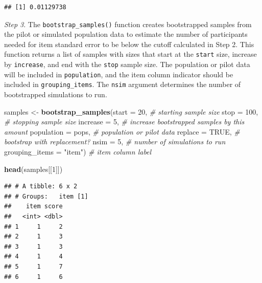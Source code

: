 \documentclass[
  man]{apa7}
\newenvironment{Shaded}{\begin{snugshade}}{\end{snugshade}}
\newcommand{\AttributeTok}[1]{\textcolor[rgb]{0.13,0.29,0.53}{#1}}
\newcommand{\CommentTok}[1]{\textcolor[rgb]{0.56,0.35,0.01}{\textit{#1}}}
\newcommand{\ConstantTok}[1]{\textcolor[rgb]{0.56,0.35,0.01}{#1}}
\newcommand{\DecValTok}[1]{\textcolor[rgb]{0.00,0.00,0.81}{#1}}
\newcommand{\FunctionTok}[1]{\textcolor[rgb]{0.13,0.29,0.53}{\textbf{#1}}}
\newcommand{\NormalTok}[1]{#1}
\newcommand{\OtherTok}[1]{\textcolor[rgb]{0.56,0.35,0.01}{#1}}
\newcommand{\SpecialCharTok}[1]{\textcolor[rgb]{0.81,0.36,0.00}{\textbf{#1}}}
\newcommand{\StringTok}[1]{\textcolor[rgb]{0.31,0.60,0.02}{#1}}
\begin{document}
\begin{Shaded}
\end{Shaded}

\begin{verbatim}
## [1] 0.01129738
\end{verbatim}

\emph{Step 3}. The \texttt{bootstrap\_samples()} function creates bootstrapped samples from the pilot or simulated population data to estimate the number of participants needed for item standard error to be below the cutoff calculated in Step 2. This function returns a list of samples with sizes that start at the \texttt{start} size, increase by \texttt{increase}, and end with the \texttt{stop} sample size. The population or pilot data will be included in \texttt{population}, and the item column indicator should be included in \texttt{grouping\_items}. The \texttt{nsim} argument determines the number of bootstrapped simulations to run.

\begin{Shaded}
\begin{Highlighting}[]
\NormalTok{samples }\OtherTok{\textless{}{-}} \FunctionTok{bootstrap\_samples}\NormalTok{(}\AttributeTok{start =} \DecValTok{20}\NormalTok{, }\CommentTok{\# starting sample size}
  \AttributeTok{stop =} \DecValTok{100}\NormalTok{, }\CommentTok{\# stopping sample size}
  \AttributeTok{increase =} \DecValTok{5}\NormalTok{, }\CommentTok{\# increase bootstrapped samples by this amount}
  \AttributeTok{population =}\NormalTok{ pops, }\CommentTok{\# population or pilot data}
  \AttributeTok{replace =} \ConstantTok{TRUE}\NormalTok{, }\CommentTok{\# bootstrap with replacement? }
  \AttributeTok{nsim =} \DecValTok{5}\NormalTok{, }\CommentTok{\# number of simulations to run}
  \AttributeTok{grouping\_items =} \StringTok{"item"}\NormalTok{) }\CommentTok{\# item column label  }

\FunctionTok{head}\NormalTok{(samples[[}\DecValTok{1}\NormalTok{]])}
\end{Highlighting}
\end{Shaded}

\begin{verbatim}
## # A tibble: 6 x 2
## # Groups:   item [1]
##    item score
##   <int> <dbl>
## 1     1     2
## 2     1     3
## 3     1     3
## 4     1     4
## 5     1     7
## 6     1     6
\end{verbatim}
\end{document}
